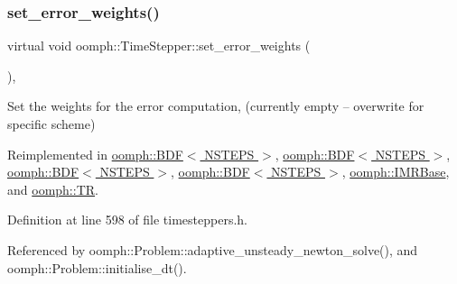 \mbox{\label{classoomph_1_1TimeStepper_aee0c1da870a603e64efebb51dfc96a3d}} 
\subsubsection{\texorpdfstring{set\+\_\+error\+\_\+weights()}{set\_error\_weights()}}
{\footnotesize\ttfamily virtual void oomph\+::\+Time\+Stepper\+::set\+\_\+error\+\_\+weights (\begin{DoxyParamCaption}{ }\end{DoxyParamCaption})\hspace{0.3cm}{\ttfamily [inline]}, {\ttfamily [virtual]}}



Set the weights for the error computation, (currently empty -- overwrite for specific scheme) 



Reimplemented in \hyperlink{classoomph_1_1BDF_ae7edaffc90cfe8cca6817751fa3cccb8}{oomph\+::\+B\+D\+F$<$ N\+S\+T\+E\+P\+S $>$}, \hyperlink{classoomph_1_1BDF_a2de533281fb6905f22217500e5c03dad}{oomph\+::\+B\+D\+F$<$ N\+S\+T\+E\+P\+S $>$}, \hyperlink{classoomph_1_1BDF_afef7f18c1227c5c96910331ab2b987e6}{oomph\+::\+B\+D\+F$<$ N\+S\+T\+E\+P\+S $>$}, \hyperlink{classoomph_1_1BDF_a298a3ba0ce469359190a3d9ceeeb3652}{oomph\+::\+B\+D\+F$<$ N\+S\+T\+E\+P\+S $>$}, \hyperlink{classoomph_1_1IMRBase_a8122f3fa05e8622db6a98072d88685e2}{oomph\+::\+I\+M\+R\+Base}, and \hyperlink{classoomph_1_1TR_aa9c84561d7019ca2e610ea8f93be7a73}{oomph\+::\+TR}.



Definition at line 598 of file timesteppers.\+h.



Referenced by oomph\+::\+Problem\+::adaptive\+\_\+unsteady\+\_\+newton\+\_\+solve(), and oomph\+::\+Problem\+::initialise\+\_\+dt().

\mbox{\label{classoomph_1_1TimeStepper_affb7d9405e9b8cfbd108082faa0c74e4}} 
